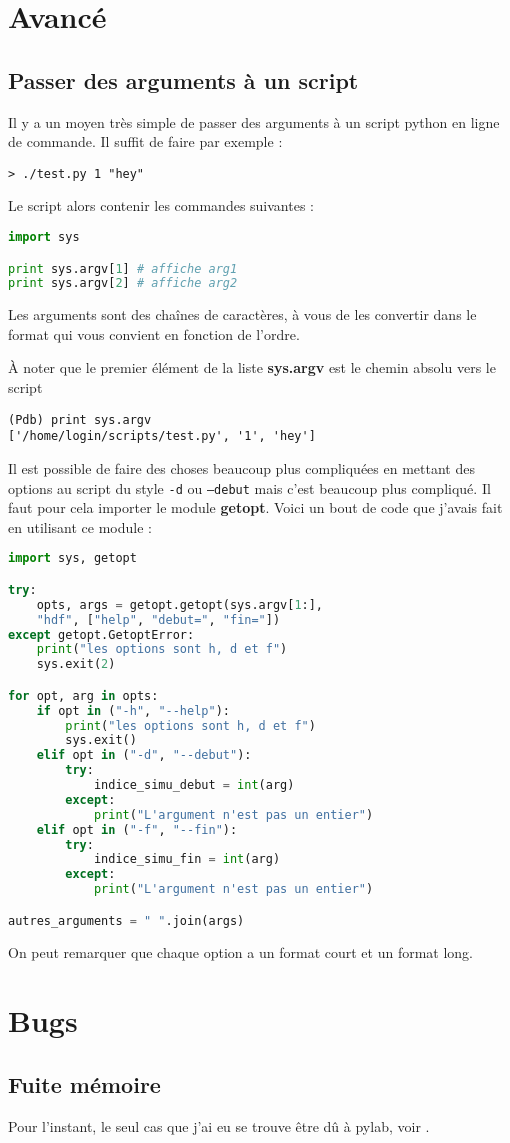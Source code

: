 \documentclass[a4paper,twoside]{article}
\begin{document}
\section{Avancé}
\subsection{Passer des arguments à un script}
Il y a un moyen très simple de passer des arguments à un script python en ligne de commande. Il suffit de faire par exemple :
\begin{verbatim}
> ./test.py 1 "hey"
\end{verbatim}

Le script alors contenir les commandes suivantes :
\begin{lstlisting}[language=python]
import sys

print sys.argv[1] # affiche arg1
print sys.argv[2] # affiche arg2
\end{lstlisting}
Les arguments sont des chaînes de caractères, à vous de les convertir dans le format qui vous convient en fonction de l'ordre.

\begin{remarque}
À noter que le premier élément de la liste \textbf{sys.argv} est le chemin absolu vers le script
\begin{verbatim}
(Pdb) print sys.argv
['/home/login/scripts/test.py', '1', 'hey']
\end{verbatim}
\end{remarque}

\bigskip

Il est possible de faire des choses beaucoup plus compliquées en mettant des options au script du style \texttt{-d} ou \texttt{--debut} mais c'est beaucoup plus compliqué. Il faut pour cela importer le module \textbf{getopt}. Voici un bout de code que j'avais fait en utilisant ce module : 
\begin{lstlisting}[language=python]
import sys, getopt

try:                                
    opts, args = getopt.getopt(sys.argv[1:], 
    "hdf", ["help", "debut=", "fin="])
except getopt.GetoptError:          
    print("les options sont h, d et f")                        
    sys.exit(2)

for opt, arg in opts:                
    if opt in ("-h", "--help"):      
        print("les options sont h, d et f")                    
        sys.exit()                  
    elif opt in ("-d", "--debut"):
        try:
            indice_simu_debut = int(arg)
        except:
            print("L'argument n'est pas un entier")
    elif opt in ("-f", "--fin"): 
        try:
            indice_simu_fin = int(arg)
        except:
            print("L'argument n'est pas un entier")

autres_arguments = " ".join(args)
\end{lstlisting}
On peut remarquer que chaque option a un format court et un format long.

\section{Bugs}
\subsection{Fuite mémoire}
Pour l'instant, le seul cas que j'ai eu se trouve être dû à pylab, voir .

\printindex
\end{document}
